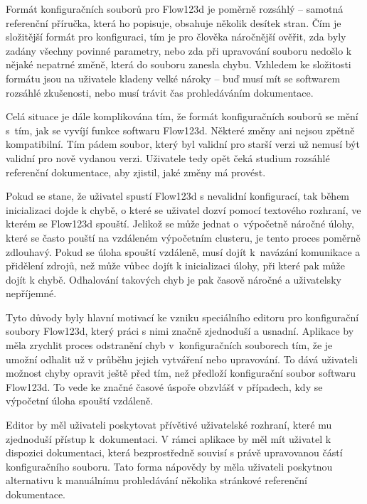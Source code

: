 \documentclass[FM,DP]{tulthesis}
\begin{document}

Formát konfiguračních souborů pro Flow123d je poměrně rozsáhlý -- samotná referenční příručka, která ho popisuje, obsahuje několik desítek stran. Čím je složitější formát pro konfiguraci, tím je pro člověka náročnější ověřit, zda byly zadány všechny povinné parametry, nebo zda při upravování souboru nedošlo k nějaké nepatrné změně, která do souboru zanesla chybu. Vzhledem ke složitosti formátu jsou na uživatele kladeny velké nároky -- buď musí mít se softwarem rozsáhlé zkušenosti, nebo musí trávit čas prohledáváním dokumentace.

Celá situace je dále komplikována tím, že formát konfiguračních souborů se mění s~tím, jak se vyvíjí funkce softwaru Flow123d. Některé změny ani nejsou zpětně kompatibilní. Tím pádem soubor, který byl validní pro starší verzi už nemusí být validní pro nově vydanou verzi. Uživatele tedy opět čeká studium rozsáhlé referenční dokumentace, aby zjistil, jaké změny má provést.

Pokud se stane, že uživatel spustí Flow123d s nevalidní konfigurací, tak během inicializaci dojde k chybě, o které se uživatel dozví pomocí textového rozhraní, ve kterém se Flow123d spouští. Jelikož se může jednat o~výpočetně náročné úlohy, které se často pouští na vzdáleném výpočetním clusteru, je tento proces poměrně zdlouhavý. Pokud se úloha spouští vzdáleně, musí dojít k~navázání komunikace a přidělení zdrojů, než může vůbec dojít k inicializaci úlohy, při které pak může dojít k chybě. Odhalování takových chyb je pak časově náročné a uživatelsky nepříjemné.

Tyto důvody byly hlavní motivací ke vzniku speciálního editoru pro konfigurační soubory Flow123d, který práci s nimi značně zjednoduší a usnadní. Aplikace by měla zrychlit proces odstranění chyb v~konfiguračních souborech tím, že je umožní odhalit už v průběhu jejich vytváření nebo upravování. To dává uživateli možnost chyby opravit ještě před tím, než předloží konfigurační soubor softwaru Flow123d. To vede ke značné časové úspoře obzvlášť v případech, kdy se výpočetní úloha spouští vzdáleně.

Editor by měl uživateli poskytovat přívětivé uživatelské rozhraní, které mu zjednoduší přístup k~dokumentaci. V rámci aplikace by měl mít uživatel k dispozici dokumentaci, která bezprostředně souvisí s právě upravovanou částí konfiguračního souboru. Tato forma nápovědy by měla uživateli poskytnou alternativu k manuálnímu prohledávání několika stránkové referenční dokumentace.
\end{document}
